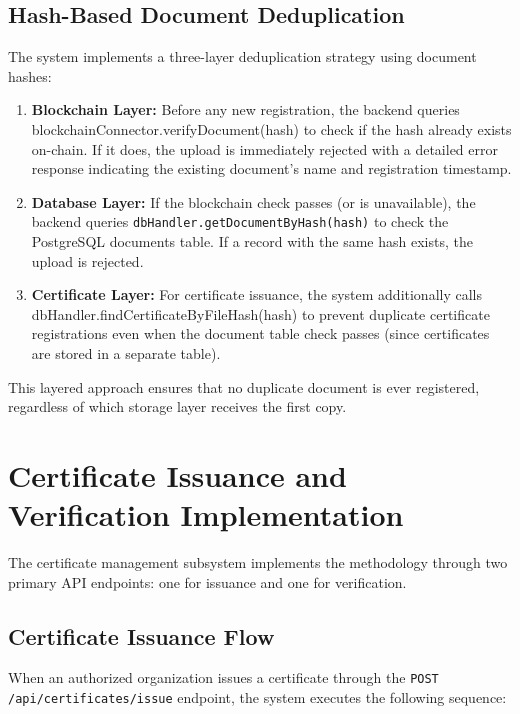 \subsection{Hash-Based Document Deduplication}

The system implements a three-layer deduplication strategy using document hashes:

\begin{enumerate}
    \item \textbf{Blockchain Layer:} Before any new registration, the backend queries {blockchainConnector.verifyDocument(hash)} to check if the hash already exists on-chain. If it does, the upload is immediately rejected with a detailed error response indicating the existing document's name and registration timestamp.
    \item \textbf{Database Layer:} If the blockchain check passes (or is unavailable), the backend queries \texttt{dbHandler.getDocumentByHash(hash)} to check the PostgreSQL documents table. If a record with the same hash exists, the upload is rejected.
    \item \textbf{Certificate Layer:} For certificate issuance, the system additionally calls \\{dbHandler.findCertificateByFileHash(hash)} to prevent duplicate certificate registrations even when the document table check passes (since certificates are stored in a separate table).
\end{enumerate}

This layered approach ensures that no duplicate document is ever registered, regardless of which storage layer receives the first copy.

\section{Certificate Issuance and Verification Implementation}

The certificate management subsystem implements the methodology through two primary API endpoints: one for issuance and one for verification.

\subsection{Certificate Issuance Flow}

When an authorized organization issues a certificate through the \texttt{POST /api/certificates/issue} endpoint, the system executes the following sequence:

